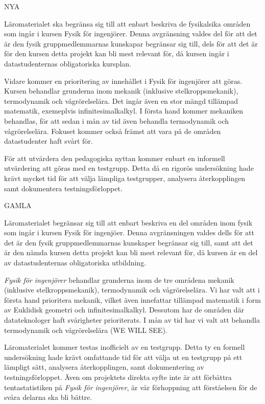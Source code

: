 \begin{draft}

NYA

Läromaterialet ska begränsa sig till att enbart beskriva de fysikalsika områden som ingår i kursen Fysik för ingenjörer. Denna avgränsning valdes del för att det är den fysik gruppmedlemmarnas kunskapar begränsar sig till, dels för att det är för den kursen detta projekt kan bli mest relevant för, då kursen ingår i datastudenternas obligatoriska kursplan.

Vidare kommer en prioritering av innehållet i Fysik för ingenjörer att göras. Kursen behandlar grunderna inom mekanik (inklusive stelkroppsmekanik), termodynamik och vågrörelselära. Det ingår även en stor mängd tillämpad matematik, exemeplvis infinitesimalkalkyl. I första hand kommer mekaniken behandlas, för att sedan i mån av tid även behandla termodynamik och vågrörelselära. Fokuset kommer också främst att vara på de områden datastudenter haft svårt för.

För att utvärdera den pedagogiska nyttan kommer enbart en informell utvärdering att göras med en testgrupp. Detta då en rigorös undersökning hade krävt mycket tid för att välja lämpliga testgrupper, analysera återkopplingen samt dokumentera testningsförloppet.

GAMLA

Läromaterialet begränsar sig till att enbart beskriva en del områden inom fysik som ingår i kursen Fysik för ingenjöer. Denna avgränsningen valdes dells för att det är den fysik gruppmedlemmarnas kunskaper begränsar sig till, samt att det är den nämda kursen detta projekt kan bli mest relevant för, då kursen är en del av datastudenternas obligatoriska utbildning.

\textit{Fysik för ingenjörer} behandlar grunderna inom de tre områdena mekanik (inklusive stelkroppsmekanik), termodynamik och vågrörelselära. Vi har valt att i första hand prioritera mekanik, vilket även innefattar tillämpad matematik i form av Euklidisk geometri och infinitesimalkalkyl. Dessutom har de områden där datateknologer haft svårigheter prioriterats. I mån av tid har vi valt att behandla termodynamik och vågrörelselära (WE WILL SEE). 

Läromaterialet kommer testas inofficielt av en testgrupp. Detta ty en formell undersökning hade krävt omfattande tid för att välja ut en testgrupp på ett lämpligt sätt, analysera återkopplingen, samt dokumentering av testningsförloppet. Även om projektets direkta syfte inte är att förbättra tentastatistiken på \textit{Fysik för ingenjörer}, är vår förhoppning att förståelsen för de svåra delarna ska bli bättre.
\end{draft}

